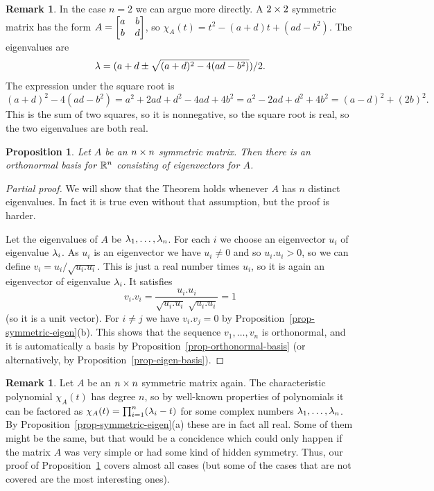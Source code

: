 \documentclass[reqno]{amsart}
\newtheorem{proposition}[theorem]{Proposition}
\theoremstyle{definition}
\newtheorem{remark}[theorem]{Remark}
\begin{document}
\begin{remark}
 In the case $n=2$ we can argue more directly.  A $2\times 2$ symmetric
 matrix has the form $A=\left[\begin{matrix} a&b \\ b&d\end{matrix}\right]$, so 
 $\chi_A(t)=t^2-(a+d)t+(ad-b^2)$.  The eigenvalues are 
 \[ \lambda = (a+d\pm\sqrt{(a+d)^2-4(ad-b^2)})/2. \]
 The expression under the square root is 
 \[ (a+d)^2-4(ad-b^2) = a^2+2ad+d^2-4ad+4b^2 =
    a^2-2ad+d^2+4b^2 = (a-d)^2+(2b)^2.
 \]
 This is the sum of two squares, so it is nonnegative, so the square
 root is real, so the two eigenvalues are both real.
\end{remark}

\begin{proposition}\label{prop-symmetric-diag}
 Let $A$ be an $n\times n$ symmetric matrix.  Then there is an
 orthonormal basis for ${\mathbb{R}}^n$ consisting of eigenvectors for $A$.
\end{proposition}
\begin{proof}[Partial proof]
 We will show that the Theorem holds whenever $A$ has $n$ distinct
 eigenvalues.  In fact it is true even without that assumption, but
 the proof is harder.

 Let the eigenvalues of $A$ be $\lambda_1,\dotsc,\lambda_n$.  For each $i$ we
 choose an eigenvector $u_i$ of eigenvalue $\lambda_i$.  As $u_i$ is an
 eigenvector we have $u_i\neq 0$ and so $u_i.u_i>0$, so we can define
 $v_i=u_i/\sqrt{u_i.u_i}$.  This is just a real number times $u_i$, so
 it is again an eigenvector of eigenvalue $\lambda_i$.  It satisfies
 \[ v_i.v_i = \frac{u_i.u_i}{\sqrt{u_i.u_i}\;\sqrt{u_i.u_i}} = 1 \]
 (so it is a unit vector).  For $i\neq j$ we have $v_i.v_j=0$ by
 Proposition~\ref{prop-symmetric-eigen}(b).   This shows that the
 sequence $v_1,\dotsc,v_n$ is orthonormal, and it is automatically a
 basis by Proposition~\ref{prop-orthonormal-basis} (or alternatively,
 by Proposition~\ref{prop-eigen-basis}).
\end{proof}

\begin{remark}
 Let $A$ be an $n\times n$ symmetric matrix again.  The characteristic
 polynomial $\chi_A(t)$ has degree $n$, so by well-known properties of
 polynomials it can be factored as $\chi_A(t)=\prod_{i=1}^n(\lambda_i-t)$
 for some complex numbers $\lambda_1,\dotsc,\lambda_n$.  By
 Proposition~\ref{prop-symmetric-eigen}(a) these are in fact all
 real.  Some of them might be the same, but that would be a concidence
 which could only happen if the matrix $A$ was very simple or had some
 kind of hidden symmetry.  Thus, our proof of
 Proposition~\ref{prop-symmetric-diag} covers almost all cases (but
 some of the cases that are not covered are the most interesting
 ones).   
\end{remark}
\end{document}

